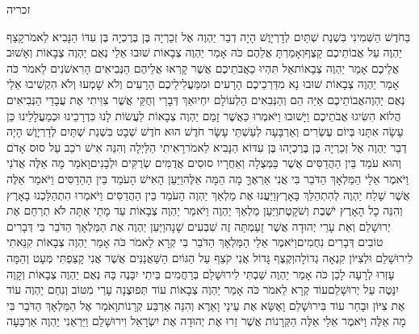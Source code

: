 \documentclass[../main/main.tex]{subfiles}
\begin{document}
\thispagestyle{empty}
\Incipit{}זכריה
\cleardoublepage
\RTLmulticolcolumns
\begin{multicols*}{\ncols}
בַּחֹדֶשׁ הַשְּׁמִינִי בִּשְׁנַת שְׁתַּיִם לְדָרְיָוֶשׁ הָיָה דְבַר יַהְוֶה אֶל זְכַרְיָה בֶּן בֶּרֶכְיָה בֶּן עִדּוֹ הַנָּבִיא לֵאמֹר\PreVerseSpace{}קָצַף יַהְוֶה עַל אֲבוֹתֵיכֶם קָצֶף\PreVerseSpace{}וְאָמַרְתָּ אֲלֵהֶם כֹּה אָמַר יַהְוֶה צְבָאוֹת שׁוּבוּ אֵלַי נְאֻם יַהְוֶה צְבָאוֹת וְאָשׁוּב אֲלֵיכֶם אָמַר יַהְוֶה צְבָאוֹת\PreVerseSpace{}אַל תִּהְיוּ כַאֲבֹתֵיכֶם אֲשֶׁר קָרְאוּ אֲלֵיהֶם הַנְּבִיאִים הָרִאשֹׁנִים לֵאמֹר כֹּה אָמַר יַהְוֶה צְבָאוֹת שׁוּבוּ נָא מִדַּרְכֵיכֶם הָרָעִים וּמִמַּעֲלִילֵיכֶם\SubEnd{} הָרָעִים וְלֹא שָׁמְעוּ וְלֹא הִקְשִׁיבוּ אֵלַי נְאֻם יַהְוֶה\PreVerseSpace{}אֲבוֹתֵיכֶם אַיֵּה הֵם וְהַנְּבִאִים הַלְעוֹלָם יִחְיוּ\PreVerseSpace{}אַךְ דְּבָרַי וְחֻקַּי אֲשֶׁר צִוִּיתִי אֶת עֲבָדַי הַנְּבִיאִים הֲלוֹא הִשִּׂיגוּ אֲבֹתֵיכֶם וַיָּשׁוּבוּ וַיֹּאמְרוּ כַּאֲשֶׁר זָמַם יַהְוֶה צְבָאוֹת לַעֲשׂוֹת לָנוּ כִּדְרָכֵינוּ וּכְמַעֲלָלֵינוּ כֵּן עָשָׂה אִתָּנוּ \ClosedSection{}בְּיוֹם עֶשְׂרִים וְאַרְבָּעָה לְעַשְׁתֵּי עָשָׂר חֹדֶשׁ הוּא חֹדֶשׁ שְׁבָט בִּשְׁנַת שְׁתַּיִם לְדָרְיָוֶשׁ הָיָה דְבַר יַהְוֶה אֶל זְכַרְיָה בֶּן בֶּרֶכְיָהוּ בֶּן עִדּוֹא הַנָּבִיא לֵאמֹר\PreVerseSpace{}רָאִיתִי הַלַּיְלָה וְהִנֵּה אִישׁ רֹכֵב עַל סוּס אָדֹם וְהוּא עֹמֵד בֵּין הַהֲדַסִּים אֲשֶׁר בַּמְּצֻלָה וְאַחֲרָיו סוּסִים אֲדֻמִּים שְׂרֻקִּים וּלְבָנִים\PreVerseSpace{}וָאֹמַר מָה אֵלֶּה אֲדֹנִי וַיֹּאמֶר אֵלַי הַמַּלְאָךְ הַדֹּבֵר בִּי אֲנִי אַרְאֶךָּ מָה הֵמָּה אֵלֶּה\PreVerseSpace{}וַיַּעַן הָאִישׁ הָעֹמֵד בֵּין הַהַדַסִּים וַיֹּאמַר אֵלֶּה אֲשֶׁר שָׁלַח יַהְוֶה לְהִתְהַלֵּךְ בָּאָרֶץ\PreVerseSpace{}וַיַּעֲנוּ אֶת מַלְאַךְ יַהְוֶה הָעֹמֵד בֵּין הַהֲדַסִּים וַיֹּאמְרוּ הִתְהַלַּכְנוּ בָאָרֶץ וְהִנֵּה כָל הָאָרֶץ יֹשֶׁבֶת וְשֹׁקָטֶת\PreVerseSpace{}וַיַּעַן מַלְאַךְ יַהְוֶה וַיֹּאמַר יַהְוֶה צְבָאוֹת עַד מָתַי אַתָּה לֹא תְרַחֵם אֶת יְרוּשָׁלֵם וְאֵת עָרֵי יְהוּדָה אֲשֶׁר זָעַמְתָּה זֶה שִׁבְעִים שָׁנָה\PreVerseSpace{}וַיַּעַן יַהְוֶה אֶת הַמַּלְאָךְ הַדֹּבֵר בִּי דְּבָרִים טוֹבִים דְּבָרִים נִחֻמִים\PreVerseSpace{}וַיֹּאמֶר אֵלַי הַמַּלְאָךְ הַדֹּבֵר בִּי קְרָא לֵאמֹר כֹּה אָמַר יַהְוֶה צְבָאוֹת קִנֵּאתִי לִירוּשָׁלֵם וּלְצִיּוֹן קִנְאָה גְדוֹלָה\PreVerseSpace{}וְקֶצֶף גָּדוֹל אֲנִי קֹצֵף עַל הַגּוֹיִם הַשַּׁאֲנַנִּים אֲשֶׁר אֲנִי קָצַפְתִּי מְּעָט וְהֵמָּה עָזְרוּ לְרָעָה \ClosedSection{}לָכֵן כֹּה אָמַר יַהְוֶה שַׁבְתִּי לִירוּשָׁלֵם בְּרַחֲמִים בֵּיתִי יִבָּנֶה בָּהּ נְאֻם יַהְוֶה צְבָאוֹת וְקָוֶה יִנָּטֶה עַל יְרוּשָׁלֵם\PreVerseSpace{}עוֹד קְרָא לֵאמֹר כֹּה אָמַר יַהְוֶה צְבָאוֹת עוֹד תְּפוּצֶנָה עָרַי מִטּוֹב וְנִחַם יַהְוֶה עוֹד אֶת צִיּוֹן וּבָחַר עוֹד בִּירוּשָׁלֵם \ClosedSection{}וָאֶשָּׂא אֶת עֵינַי וָאֵרֶא וְהִנֵּה אַרְבַּע קְרָנוֹת\PreVerseSpace{}וָאֹמַר אֶל הַמַּלְאָךְ הַדֹּבֵר בִּי מָה אֵלֶּה וַיֹּאמֶר אֵלַי אֵלֶּה הַקְּרָנוֹת אֲשֶׁר זֵרוּ אֶת יְהוּדָה אֶת יִשְׂרָאֵל וִירוּשָׁלֵם \ClosedSection{}וַיַּרְאֵנִי יַהְוֶה אַרְבָּעָה 
\end{multicols*}
\end{document}
